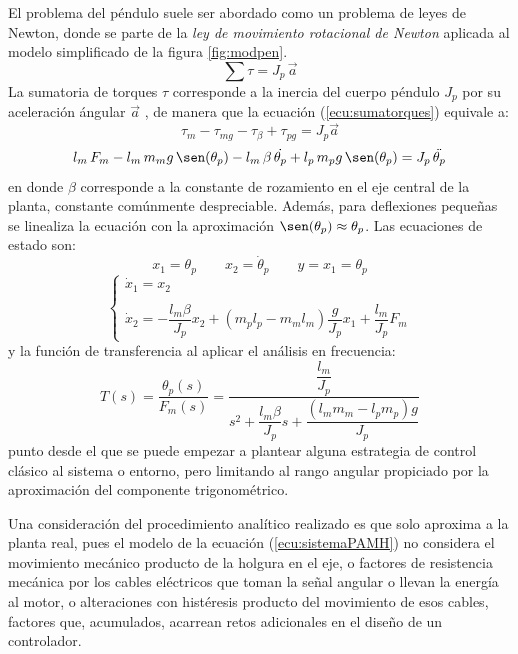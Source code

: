 El problema del péndulo suele ser abordado como un problema de leyes de Newton, donde se parte de la \textit{ley de movimiento rotacional de Newton} aplicada al modelo simplificado de la figura \ref{fig:modpen}.
\begin{equation}
\sum \tau = J_p\, \vec{a}
\label{ecu:sumatorques}
\end{equation}
La sumatoria de torques $\tau$ corresponde a la inercia del cuerpo péndulo $J_p$ por su aceleración ángular $\vec{a}$ \cite{Ogata}, de manera que la ecuación (\ref{ecu:sumatorques}) equivale a:
\[\tau_m - \tau_{mg} - \tau_{\beta} + \tau_{pg} = J_p \vec{a}\]
\begin{equation}
l_m\, F_m - l_m\, m_m g \,\sen(\theta_p)- l_m \,\beta \,\dot{\theta_p} + l_p\, m_p g\, \sen(\theta_p) = J_p\, \ddot{\theta_p}
\end{equation}
en donde $\beta$ corresponde a la constante de rozamiento en el eje central de la planta, constante comúnmente despreciable. Además, para deflexiones pequeñas se linealiza la ecuación con la aproximación $\sen(\theta_p) \approx \theta_p$. Las ecuaciones de estado son:
\[x_1 = \theta_p \qquad x_2 = \dot{\theta}_p \qquad y = x_1 = \theta_p\]
\begin{equation}
	\left \{ \begin{array}{lcc} \dot{x}_1 = x_2 \\ \\ \dot{x}_2 = -\dfrac{l_m \beta}{J_p} x_2 + (m_p l_p -m_m l_m)\dfrac{g}{J_p}x_1 +\dfrac{l_m}{J_p}F_m \end{array} \right.
	\label{ecu:sistemaPAMH}
\end{equation}
y la función de transferencia al aplicar el análisis en frecuencia:
\begin{equation}
T(s) = \frac{\theta_p(s)}{F_m(s)} = \frac{\dfrac{l_m}{J_p}}{s^2 + \dfrac{l_m\beta}{J_p}s +\dfrac{(l_m m_m-l_p m_p)g}{J_p}}
\end{equation}
punto desde el que se puede empezar a plantear alguna estrategia de control clásico al sistema o entorno, pero limitando al rango angular propiciado por la aproximación del componente trigonométrico.

Una consideración del procedimiento analítico realizado es que solo aproxima a la planta real, pues el modelo de la ecuación (\ref{ecu:sistemaPAMH}) no considera el movimiento mecánico producto de la holgura en el eje, o factores de resistencia mecánica por los cables eléctricos que toman la señal angular o llevan la energía al motor, o alteraciones con histéresis producto del movimiento de esos cables, factores que, acumulados, acarrean retos adicionales en el diseño de un controlador.

